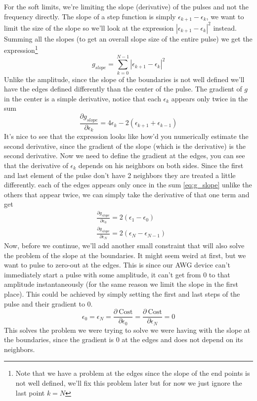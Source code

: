 For the soft limits, we're limiting the slope (derivative) of the pulses and not the frequency directly. The slope of a step function is simply $\epsilon_{k+1} - \epsilon_{k}$, we want to limit the size of the slope so we'll look at the expression $|\epsilon_{k+1} - \epsilon_{k}|^2$ instead. Summing all the slopes (to get an overall slope size of the entire pulse) we get the expression\footnote{Note that we have a problem at the edges since the slope of the end points is not well defined, we'll fix this problem later but for now we just ignore the last point $k=N$}
\begin{equation}\label{eq:g_slope}
    g_{slope} = \sum_{k=0}^{N-1} |\epsilon_{k+1} - \epsilon_{k}|^2
\end{equation}{}
Unlike the amplitude, since the slope of the boundaries is not well defined we'll have the edges defined differently than the center of the pulse. The gradient of $g$ in the center is a simple derivative, notice that each $\epsilon_k$ appears only twice in the sum
\[
    \frac{\partial g_{slope}}{\partial \epsilon_k} = 4\epsilon_k - 2 (\epsilon_{k+1} + \epsilon_{k-1})
\]
It's nice to see that the expression looks like how'd you numerically estimate the second derivative, since the gradient of the slope (which is the derivative) is the second derivative. Now we need to define the gradient at the edges, you can see that the derivative of $\epsilon_k$ depends on his neighbors on both sides. Since the first and last element of the pulse don't have 2 neighbors they are treated a little differently. each of the edges appears only once in the sum \ref{eq:g_slope} unlike the others that appear twice, we can simply take the derivative of that one term and get
\begin{align*}
    &\frac{\partial g_{slope}}{\partial \epsilon_0} = 2 (\epsilon_1 - \epsilon_0) \\
    &\frac{\partial g_{slope}}{\partial \epsilon_N} = 2 (\epsilon_N - \epsilon_{N-1})
\end{align*} 
Now, before we continue, we'll add another small constraint that will also solve the problem of the slope at the boundaries. It might seem weird at first, but we want to pulse to zero-out at the edges. This is since our AWG device can't immediately start a pulse with some amplitude, it can't get from 0 to that amplitude instantaneously (for the same reason we limit the slope in the first place). This could be achieved by simply setting the first and last steps of the pulse and their gradient to 0.
\[
    \epsilon_0 = \epsilon_N = \frac{\partial \ \text{Cost}}{\partial \epsilon_0} = \frac{\partial \ \text{Cost}}{\partial \epsilon_N} = 0
\]
This solves the problem we were trying to solve we were having with the slope at the boundaries, since the gradient is 0 at the edges and does not depend on its neighbors.%


